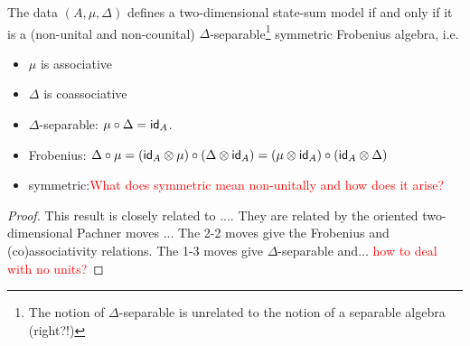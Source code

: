 \begin{lemma}
    The data $(A,\mu,\Delta)$ defines a two-dimensional state-sum model if and only if it is a (non-unital and non-counital) $\Delta$-separable\footnote{The notion of $\Delta$-separable is unrelated to the notion of a separable algebra (right?!)} symmetric Frobenius algebra, i.e.
    \begin{itemize}
        \item $\mu$ is associative
        \item $\Delta$ is coassociative
        \item $\Delta$-separable: $\mu \circ \Delta = \mathsf{id}_A$.
        \item Frobenius: $\Delta \circ \mu = (\mathsf{id}_A \otimes \mu) \circ (\Delta \otimes \mathsf{id}_A) = (\mu \otimes \mathsf{id}_A) \circ (\mathsf{id}_A \otimes \Delta)$
        \item symmetric:\textcolor{red}{What does symmetric mean non-unitally and how does it arise?}
    \end{itemize}
\end{lemma}
\begin{proof}
    This result is closely related to \cite[Proposition 3.4]{carqueville2016orbifoldcompletion}....
    They are related by the oriented two-dimensional Pachner moves \cite[Example 3.4(i)]{carqueville2019orbifolds}...
    The 2-2 moves give the Frobenius and (co)associativity relations.
    The 1-3 moves give $\Delta$-separable and... \textcolor{red}{how to deal with no units?}
\end{proof}
